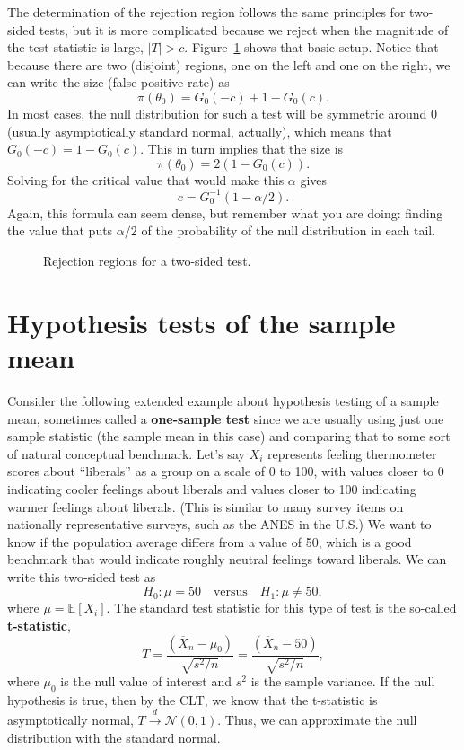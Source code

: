 \documentclass[
  13pt,
  letterpaper,
  DIV=11,
  numbers=noendperiod]{scrreprt}
\newcommand{\E}{\mathbb{E}}
\newcommand{\N}{\mathcal{N}}
\newcommand{\Xbar}{\overline{X}}
\newcommand{\indist}{\overset{d}{\to}}
\theoremstyle{definition}
\theoremstyle{definition}
\theoremstyle{plain}
\theoremstyle{remark}
\begin{document}
The determination of the rejection region follows the same principles
for two-sided tests, but it is more complicated because we reject when
the magnitude of the test statistic is large, \(|T| > c\).
Figure~\ref{fig-two-sided} shows that basic setup. Notice that because
there are two (disjoint) regions, one on the left and one on the right,
we can write the size (false positive rate) as \[ 
\pi(\theta_0) = G_0(-c) + 1 - G_0(c).
\] In most cases, the null distribution for such a test will be
symmetric around 0 (usually asymptotically standard normal, actually),
which means that \(G_0(-c) = 1 - G_0(c)\). This in turn implies that the
size is \[ 
\pi(\theta_0) = 2(1 - G_0(c)).
\] Solving for the critical value that would make this \(\alpha\) gives
\[ 
c = G^{-1}_0(1 - \alpha/2).
\] Again, this formula can seem dense, but remember what you are doing:
finding the value that puts \(\alpha/2\) of the probability of the null
distribution in each tail.

\begin{figure}[th]


\caption{\label{fig-two-sided}Rejection regions for a two-sided test.}

\end{figure}%

\section{Hypothesis tests of the sample
mean}\label{hypothesis-tests-of-the-sample-mean}

Consider the following extended example about hypothesis testing of a
sample mean, sometimes called a \textbf{one-sample test} since we are
usually using just one sample statistic (the sample mean in this case)
and comparing that to some sort of natural conceptual benchmark. Let's
say \(X_i\) represents feeling thermometer scores about ``liberals'' as
a group on a scale of 0 to 100, with values closer to 0 indicating
cooler feelings about liberals and values closer to 100 indicating
warmer feelings about liberals. (This is similar to many survey items on
nationally representative surveys, such as the ANES in the U.S.) We want
to know if the population average differs from a value of 50, which is a
good benchmark that would indicate roughly neutral feelings toward
liberals. We can write this two-sided test as \[
H_0: \mu = 50 \quad\text{versus}\quad H_1: \mu \neq 50,
\] where \(\mu = \E[X_i]\). The standard test statistic for this type of
test is the so-called \textbf{t-statistic}, \[ 
T = \frac{\left( \Xbar_n - \mu_0 \right)}{\sqrt{s^2 / n}} =\frac{\left( \Xbar_n - 50 \right)}{\sqrt{s^2 / n}},
\] where \(\mu_0\) is the null value of interest and \(s^2\) is the
sample variance. If the null hypothesis is true, then by the CLT, we
know that the t-statistic is asymptotically normal,
\(T \indist \N(0, 1)\). Thus, we can approximate the null distribution
with the standard normal.
\end{document}
